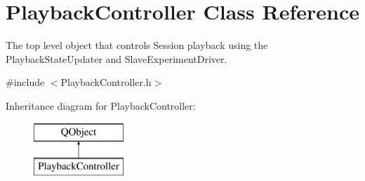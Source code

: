 \hypertarget{class_playback_controller}{\section{Playback\-Controller Class Reference}
\label{class_playback_controller}
}


The top level object that controls Session playback using the Playback\-State\-Updater and Slave\-Experiment\-Driver.  




{\ttfamily \#include $<$Playback\-Controller.\-h$>$}

Inheritance diagram for Playback\-Controller\-:\begin{figure}[H]
\begin{center}
\leavevmode
\includegraphics[height=2.000000cm]{class_playback_controller}
\end{center}
\end{figure}
